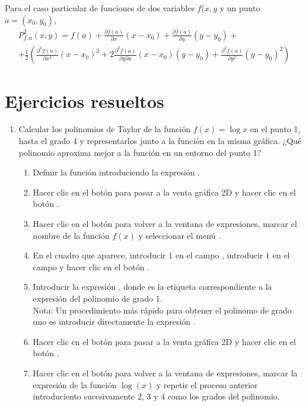 Para el caso particular de funciones de dos variables $f(x,y$ y un punto $a=(x_0,y_0)$, 
\begin{multline*}
P^2_{f,a}(x,y) = f(a)+\frac{\partial f(a)}{\partial x}(x-x_0)+\frac{\partial f(a)}{\partial y}(y-y_0)+\\
+\frac{1}{2}\left(\frac{\partial^2 f(a)}{\partial x^2}(x-x_0)^2 + 2\frac{\partial^2 f(a)}{\partial y\partial x}
(x-x_0)(y-y_0) + \frac{\partial^2 f(a)}{\partial y^2}(y-y_0)^2\right)
\end{multline*}


\newpage

\section{Ejercicios resueltos}

\begin{enumerate}[leftmargin=*]
\item Calcular los polinomios de Taylor de la función $f(x)=\log x$ en el punto 1, hasta el grado 4 y representarlos junto a la función en
la misma gráfica.
¿Qué polinomio aproxima mejor a la función en un entorno del punto 1?

\begin{indicacion}
\begin{enumerate}
\item Definir la función introduciendo la expresión . 
\item Hacer clic en el botón  para pasar a la venta gráfica 2D y hacer clic en el botón
.
\item Hacer clic en el botón   para volver a la ventana de expresiones,
marcar el nombre de la función $f(x)$ y seleccionar el menú .
\item En el cuadro que aparece, introducir $1$ en el campo , introducir $1$ en el campo  y
hacer clic en el botón .
\item Introducir la expresión , donde  es la etiqueta correspondiente a la expresión
del polinomio de grado 1.\\
Nota: Un procedimiento más rápido para obtener el polinomo de grado uno es introducir directamente la expresión
.
\item Hacer clic en el botón  para pasar a la venta gráfica 2D y hacer clic en el botón
.
\item Hacer clic en el botón  para volver a la ventana de expresiones, marcar la
expresión de la función $\log(x)$ y repetir el proceso anterior introduciento sucesivamente 2, 3 y 4 como los grados del polinomio.
\end{enumerate}
\end{indicacion}


\end{enumerate}
